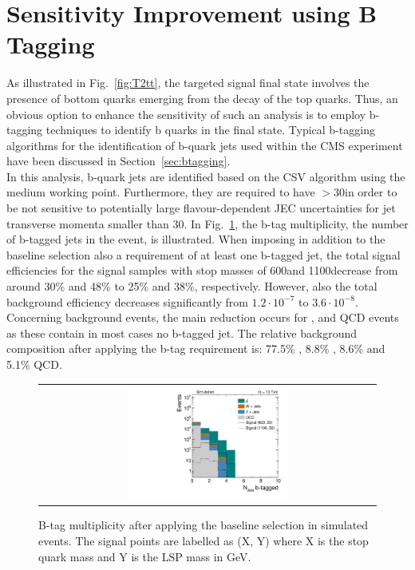 \section{Sensitivity Improvement using B Tagging}
\label{sec:stop_btagging}
As illustrated in Fig.~\ref{fig:T2tt}, the targeted signal final state involves the presence of bottom quarks emerging from the decay of the top quarks. Thus, an obvious option to enhance the sensitivity of such an analysis is to employ b-tagging techniques to identify b quarks in the final state. Typical b-tagging algorithms for the identification of b-quark jets used within the CMS experiment have been discussed in Section~\ref{sec:btagging}. \\
In this analysis, b-quark jets are identified based on the CSV algorithm using the medium working point. Furthermore, they are required to have \pt$> 30$\gev in order to be not sensitive to potentially large flavour-dependent JEC uncertainties for jet transverse momenta smaller than 30\gev. In Fig.~\ref{fig:stop_baseline_btag}, the b-tag multiplicity, \ie the number of b-tagged jets in the event, is illustrated.  %
When imposing in addition to the baseline selection also a requirement of at least one b-tagged jet, the total signal efficiencies for the signal samples with stop masses of 600\gev and 1100\gev decrease from around 30\% and 48\% to 25\% and 38\%, respectively. However, also the total background efficiency decreases significantly from $1.2 \cdot 10^{-7}$ to $3.6 \cdot 10^{-8}$. Concerning background events, the main reduction occurs for \WJets, \ZJets and QCD events as these contain in most cases no b-tagged jet. The relative background composition after applying the b-tag requirement is: 77.5\% \ttbar, 8.8\% \WJets, 8.6\% \ZJets and 5.1\% QCD.        
\begin{figure}[!t]
  \centering
  \begin{tabular}{c}
                \includegraphics[width=0.49\textwidth]{figures/Stop_DeltaPhiSelection_N_jets_btagged.pdf}%
  \end{tabular}
  \caption{B-tag multiplicity after applying the baseline selection in simulated events. The signal points are labelled as (X, Y) where X is the stop quark mass and Y is the LSP mass in GeV.}
  \label{fig:stop_baseline_btag}
\end{figure}
